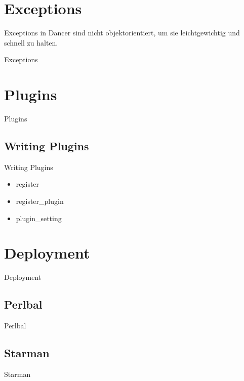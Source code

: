 \section{Exceptions}
Exceptions in Dancer sind nicht objektorientiert, um sie
leichtgewichtig und schnell zu halten.
\begin{frame}{Exceptions}
\end{frame}

\section{Plugins}
\begin{frame}{Plugins}
\end{frame}

\subsection{Writing Plugins}
\begin{frame}{Writing Plugins}
\begin{itemize}
\item register
\item register\_plugin
\item plugin\_setting
\end{itemize}
\end{frame}

\section{Deployment}
\begin{frame}{Deployment}
\end{frame}

\subsection{Perlbal}
\begin{frame}{Perlbal}
\end{frame}

\subsection{Starman}
\begin{frame}{Starman}
\end{frame}


